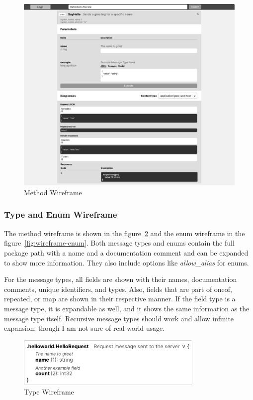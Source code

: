 \begin{figure}[hbt!]
    \centering
    \captionsetup{justification=centering}
    \includegraphics[width=1.0\textwidth]{images/design/wireframes/method}
    \caption{Method Wireframe}
    \label{fig:wireframe-method}
\end{figure}

\subsubsection{Type and Enum Wireframe}
The method wireframe is shown in the figure~\ref{fig:wireframe-type} and the enum wireframe in the figure~\ref{fig:wireframe-enum}.
Both message types and enums contain the full package path with a name and a documentation comment and can be expanded to show more information.
They also include options like \textit{allow\_alias} for enums.

For the message types, all fields are shown with their names, documentation comments, unique identifiers, and types.
Also, fields that are part of oneof, repeated, or map are shown in their respective manner.
If the field type is a message type, it is expandable as well, and it shows the same information as the message type itself.
Recursive message types should work and allow infinite expansion, though I am not sure of real-world usage.

\begin{figure}[hbt!]
    \centering
    \captionsetup{justification=centering}
    \includegraphics[width=0.8\textwidth]{images/design/wireframes/type}
    \caption{Type Wireframe}
    \label{fig:wireframe-type}
\end{figure}


